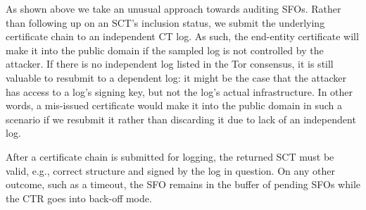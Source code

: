 As shown above we take an unusual approach towards auditing SFOs.  Rather than
following up on an SCT's inclusion status, we submit the underlying
certificate chain to an independent CT log.  As such, the end-entity certificate
will make it into the public domain if the sampled log is not controlled by the
attacker.  If there is no independent log listed in the Tor consensus, it is
still valuable to resubmit to a dependent log:
	it might be the case that the attacker has access to a log's signing key,
	but not the log's actual infrastructure.
In other words, a mis-issued certificate would make it into the public domain in
such a scenario if we resubmit it rather than discarding it due to lack of
an independent log.

After a certificate chain is submitted for logging, the returned SCT must be
valid, e.g., correct structure and signed by the log in question.  On any other
outcome, such as a timeout, the SFO remains in the buffer of pending SFOs while
the CTR goes into back-off mode.

